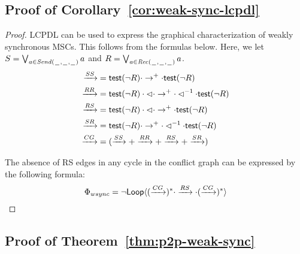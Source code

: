 \documentclass[a4paper,UKenglish,cleveref, autoref, thm-restate]{lipics-v2021}
\begin{document}
\subsection{Proof of Corollary~\ref{cor:weak-sync-lcpdl}}

\weaksynclcpdl*

\begin{proof}
LCPDL can be used to express the graphical characterization of weakly synchronous MSCs. This follows from the formulas below. Here, we let $S = \bigvee_{a \in {\mathit{Send}(\hspace{0.1em}\underline{\hspace{0.5em}}\hspace{0.1em},\hspace{0.1em}\underline{\hspace{0.5em}}\hspace{0.1em},\hspace{0.1em}\underline{\hspace{0.5em}}\hspace{0.1em})}} a$ and $R = \bigvee_{a \in {\mathit{Rec}(\hspace{0.1em}\underline{\hspace{0.5em}}\hspace{0.1em},\hspace{0.1em}\underline{\hspace{0.5em}}\hspace{0.1em},\hspace{0.1em}\underline{\hspace{0.5em}}\hspace{0.1em})}} a$.
\begin{align*}
	\xrightarrow{SS} & = \textsf{test}(\neg R) \cdot \to^+ \cdot \textsf{test}(\neg R) \\
	\xrightarrow{RR} & = \textsf{test}(\neg R) \cdot \lhd \cdot \to^+ \cdot \lhd^{-1} \cdot \textsf{test}(\neg R) \\
	\xrightarrow{RS} & = \textsf{test}(\neg R) \cdot \lhd \cdot \to^+ \cdot \textsf{test}(\neg R) \\
	\xrightarrow{SR} & = \textsf{test}(\neg R) \cdot \to^+ \cdot \lhd^{-1} \cdot \textsf{test}(\neg R) \\
	\xrightarrow{CG} & = (\xrightarrow{SS} + \xrightarrow{RR} + \xrightarrow{RS} + \xrightarrow{SR})
\end{align*}

The absence of RS edges in any cycle in the conflict graph can be expressed by the following formula:
\[
\Phi_{wsync} = \neg \textsf{Loop}\langle (\xrightarrow{CG})^*\cdot \xrightarrow{RS} \cdot (\xrightarrow{CG})^* \rangle
\qedhere
\]
\end{proof}


\subsection{Proof of Theorem~\ref{thm:p2p-weak-sync}}
\label{app:p2p-weak-sync}

\ppweaksynch*

\newcommand{\pcpSigma}{A}
\end{document}
